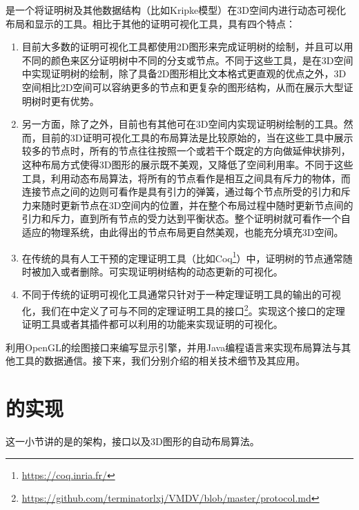 是一个将证明树及其他数据结构（比如Kripke模型）在3D空间内进行动态可视化布局和显示的工具。相比于其他的证明可视化工具，具有四个特点：
\begin{enumerate}
	\item 目前大多数的证明可视化工具\cite{byrnes2009visualizing,LibalRR14,sakurai2011mikibeta,steel2005visualising}都使用2D图形来完成证明树的绘制，并且可以用不同的颜色来区分证明树中不同的分支或节点。不同于这些工具，是在3D空间中实现证明树的绘制，除了具备2D图形相比文本格式更直观的优点之外，3D空间相比2D空间可以容纳更多的节点和更复杂的图形结构，从而在展示大型证明树时更有优势。
	\item 另一方面，除了之外，目前也有其他可在3D空间内实现证明树绘制的工具\cite{Farmer200939,bajaj2003interactive}。然而，目前的3D证明可视化工具的布局算法是比较原始的，当在这些工具中展示较多的节点时，所有的节点往往按照一个或若干个既定的方向做延伸状排列，这种布局方式使得3D图形的展示既不美观，又降低了空间利用率。不同于这些工具，利用动态布局算法，将所有的节点看作是相互之间具有斥力的物体，而连接节点之间的边则可看作是具有引力的弹簧，通过每个节点所受的引力和斥力来随时更新节点在3D空间内的位置，并在整个布局过程中随时更新节点间的引力和斥力，直到所有节点的受力达到平衡状态。整个证明树就可看作一个自适应的物理系统，由此得出的节点布局更自然美观，也能充分填充3D空间。
	\item 在传统的具有人工干预的定理证明工具（比如Coq\footnote{\url{https://coq.inria.fr/}}）中，证明树的节点通常随时被加入或者删除。可实现证明树结构的动态更新的可视化。
	\item 不同于传统的证明可视化工具通常只针对于一种定理证明工具的输出的可视化，我们在中定义了可与不同的定理证明工具的接口\footnote{\url{https://github.com/terminatorlxj/VMDV/blob/master/protocol.md}}。实现这个接口的定理证明工具或者其插件都可以利用的功能来实现证明的可视化。
\end{enumerate}


利用\textsf{OpenGL}的绘图接口来编写显示引擎，并用Java编程语言来实现布局算法与其他工具的数据通信。接下来，我们分别介绍的相关技术细节及其应用。



\section{的实现}
这一小节讲的是的架构，接口以及3D图形的自动布局算法。
